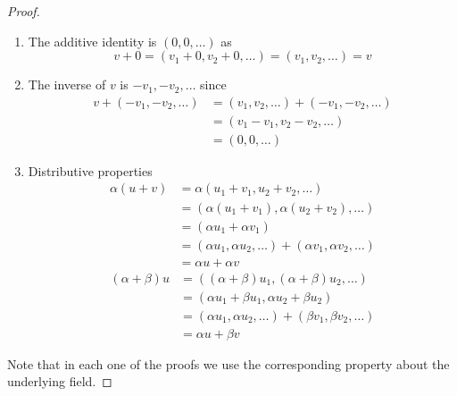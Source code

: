 \begin{proof}
\begin{enumerate}
\begin{align*}
            \beta  \right) v _{ 2 } , \ldots  \right) \\
            &= \left( \alpha \left( \beta v _{ 1 }  \right) , \alpha \left(
            \beta v _{ 2 }  \right) , \ldots \right) \\
            &= \alpha \left( \beta v \right) 
        \end{align*}
        \item The additive identity is \( \left( 0, 0, \ldots \right)  \) as
            \[
            v +  0 =  \left( v _{ 1 } +  0 , v _{ 2 } +  0 , \ldots  \right) =
            \left( v _{ 1 } , v _{ 2 } , \ldots  \right) =  v
            \]
        \item The inverse of \( v \) is \( - v _{ 1 } , -  v _{ 2 } , \ldots
        \) since 
        \begin{align*}
             v +  \left( - v _{  1 } , -  v _{ 2 } , \ldots \right) &= \left( v
             _{ 1 } , v _{  2 } , \ldots \right)   +  \left( - v _{  1 } , -  v
             _{ 2 } , \ldots \right) \\
             &= \left( v _{ 1 }  -  v _{ 1 } , v _{  2 } -  v _{ 2 } , \ldots
             \right) \\
             &= \left( 0, 0, \ldots \right) 
        \end{align*}
        \item Distributive properties
        \begin{align*}
            \alpha \left( u +  v \right) &= \alpha \left( u _{ 1 } +  v _{ 1 } ,
            u _{  2 }  +  v  _{ 2 } , \ldots\right)  \\
            &= \left( \alpha \left( u _{ 1 }  +  v _{ 1 }  \right) , \alpha
            \left( u _{ 2 }  +  v _{ 2 }  \right) , \ldots \right) \\
            &= \left( \alpha u _{ 1 } +  \alpha  v _{ 1 }  \right) \\
            &= \left( \alpha u _{ 1 } , \alpha u _{ 2 } , \ldots \right)  +
            \left( \alpha v _{ 1 } , \alpha  v _{ 2 } , \ldots \right) \\
            &= \alpha u +  \alpha v
        \end{align*}
        \begin{align*}
            \left( \alpha  +  \beta  \right) u &= \left( \left( \alpha +  \beta
            \right) u _{ 1 } , \left( \alpha +  \beta  \right) u _{ 2 } , \ldots
            \right) \\
            &= \left( \alpha u _{ 1 } +  \beta u_{ 1 }, \alpha u _{ 2 } +  \beta u
            _{ 2 } \right) \\
            &= \left( \alpha u _{ 1 } , \alpha u _{ 2 } , \ldots \right) + \left(
            \beta v _{ 1 } , \beta v _{ 2 } , \ldots \right)\\
            &= \alpha u +  \beta v
        \end{align*}
\end{enumerate}
Note that in each one of the proofs we use the corresponding property about the
underlying field.
\end{proof}
